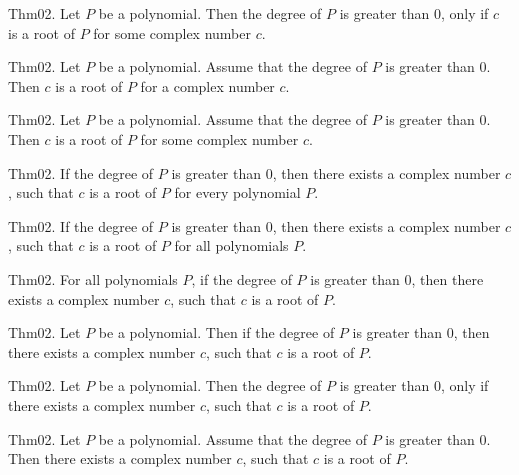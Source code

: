 \documentclass{article}
\begin{document}
Thm02. Let $P$ be a polynomial. Then the degree of $P$ is greater than $0$, only if $c$ is a root of $P$ for some complex number $c$.

Thm02. Let $P$ be a polynomial. Assume that the degree of $P$ is greater than $0$. Then $c$ is a root of $P$ for a complex number $c$.

Thm02. Let $P$ be a polynomial. Assume that the degree of $P$ is greater than $0$. Then $c$ is a root of $P$ for some complex number $c$.

Thm02. If the degree of $P$ is greater than $0$, then there exists a complex number $c$, such that $c$ is a root of $P$ for every polynomial $P$.

Thm02. If the degree of $P$ is greater than $0$, then there exists a complex number $c$, such that $c$ is a root of $P$ for all polynomials $P$.

Thm02. For all polynomials $P$, if the degree of $P$ is greater than $0$, then there exists a complex number $c$, such that $c$ is a root of $P$.

Thm02. Let $P$ be a polynomial. Then if the degree of $P$ is greater than $0$, then there exists a complex number $c$, such that $c$ is a root of $P$.

Thm02. Let $P$ be a polynomial. Then the degree of $P$ is greater than $0$, only if there exists a complex number $c$, such that $c$ is a root of $P$.

Thm02. Let $P$ be a polynomial. Assume that the degree of $P$ is greater than $0$. Then there exists a complex number $c$, such that $c$ is a root of $P$.
\end{document}
